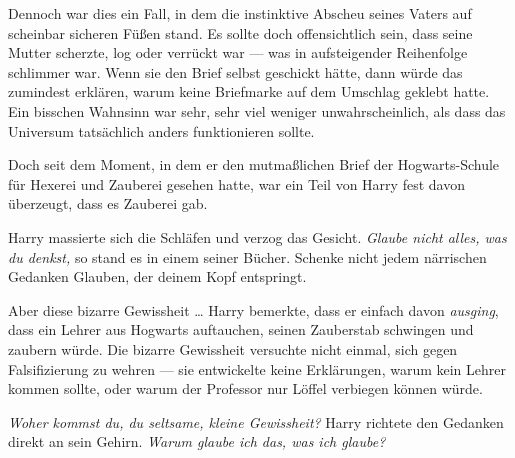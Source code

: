 Dennoch war dies ein Fall, in dem die instinktive Abscheu seines Vaters auf scheinbar sicheren Füßen stand. Es sollte doch offensichtlich sein, dass seine Mutter scherzte, log oder verrückt war — was in aufsteigender Reihenfolge schlimmer war. Wenn sie den Brief selbst geschickt hätte, dann würde das zumindest erklären, warum keine Briefmarke auf dem Umschlag geklebt hatte. Ein bisschen Wahnsinn war sehr, sehr viel weniger unwahrscheinlich, als dass das Universum tatsächlich anders funktionieren sollte.

Doch seit dem Moment, in dem er den mutmaßlichen Brief der Hogwarts-Schule für Hexerei und Zauberei gesehen hatte, war ein Teil von Harry fest davon überzeugt, dass es Zauberei gab.

Harry massierte sich die Schläfen und verzog das Gesicht. \emph{Glaube nicht alles, was du denkst,} so stand es in einem seiner Bücher. Schenke nicht jedem närrischen Gedanken Glauben, der deinem Kopf entspringt.

Aber diese bizarre Gewissheit … Harry bemerkte, dass er einfach davon \emph{ausging}, dass ein Lehrer aus Hogwarts auftauchen, seinen Zauberstab schwingen und zaubern würde. Die bizarre Gewissheit versuchte nicht einmal, sich gegen Falsifizierung zu wehren — sie entwickelte keine Erklärungen, warum kein Lehrer kommen sollte, oder warum der Professor nur Löffel verbiegen können würde.

\emph{Woher kommst du, du seltsame, kleine Gewissheit?} Harry richtete den Gedanken direkt an sein Gehirn. \emph{Warum glaube ich das, was ich glaube?}

